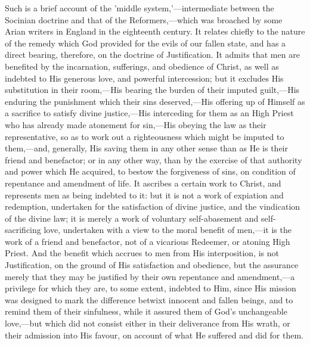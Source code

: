 \documentclass[
]{book}
\begin{document}
Such is a brief account of the 'middle system,'---intermediate between the Socinian doctrine and that of the Reformers,---which was broached by some Arian writers in England in the eighteenth century. It relates chiefly to the nature of the remedy which God provided for the evils of our fallen state, and has a direct bearing, therefore, on the doctrine of Justification. It admits that men are benefited by the incarnation, sufferings, and obedience of Christ, as well as indebted to His generous love, and powerful intercession; but it excludes His substitution in their room,---His bearing the burden of their imputed guilt,---His enduring the punishment which their sins deserved,---His offering up of Himself as a sacrifice to satisfy divine justice,---His interceding for them as an High Priest who has already made atonement for sin,---His obeying the law as their representative, so as to work out a righteousness which might be imputed to them,---and, generally, His saving them in any other sense than as He is their friend and benefactor; or in any other way, than by the exercise of that authority and power which He acquired, to bestow the forgiveness of sins, on condition of repentance and amendment of life. It ascribes a certain work to Christ, and represents men as being indebted to it: but it is not a work of expiation and redemption, undertaken for the satisfaction of divine justice, and the vindication of the divine law; it is merely a work of voluntary self-abasement and self-sacrificing love, undertaken with a view to the moral benefit of men,---it is the work of a friend and benefactor, not of a vicarious Redeemer, or atoning High Priest. And the benefit which accrues to men from His interposition, is not Justification, on the ground of His satisfaction and obedience, but the assurance merely that they may be justified by their own repentance and amendment,---a privilege for which they are, to some extent, indebted to Him, since His mission was designed to mark the difference betwixt innocent and fallen beings, and to remind them of their sinfulness, while it assured them of God's unchangeable love,---but which did not consist either in their deliverance from His wrath, or their admission into His favour, on account of what He suffered and did for them.
\end{document}
